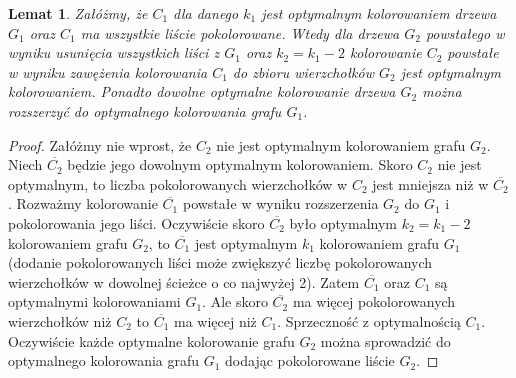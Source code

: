 \documentclass{article}
\newtheorem{lemat}{Lemat}
\begin{document}
\begin{lemat}
Załóżmy, że $C_1$ dla danego $k_1$ jest optymalnym kolorowaniem drzewa $G_1$ oraz $C_1$ ma wszystkie liście pokolorowane. Wtedy dla drzewa $G_2$ powstałego w wyniku usunięcia wszystkich liści z $G_1$ oraz $k_2 = k_1 - 2$ kolorowanie $C_2$ powstałe w wyniku zawężenia kolorowania $C_1$ do zbioru wierzchołków $G_2$ jest optymalnym kolorowaniem. Ponadto dowolne optymalne kolorowanie drzewa $G_2$ można rozszerzyć do optymalnego kolorowania grafu $G_1$.
\end{lemat}
\begin{proof}
Załóżmy nie wprost, że $C_2$ nie jest optymalnym kolorowaniem grafu $G_2$. Niech $\overline{C_2}$ będzie jego dowolnym optymalnym kolorowaniem. Skoro $C_2$ nie jest optymalnym, to liczba pokolorowanych wierzchołków w $C_2$ jest mniejsza niż w $\overline{C_2}$. Rozważmy kolorowanie $\overline{C_1}$ powstałe w wyniku rozszerzenia $G_2$ do $G_1$ i pokolorowania jego liści. Oczywiście skoro $\overline{C_2}$ było optymalnym $k_2 = k_1 - 2$ kolorowaniem grafu $G_2$, to $\overline{C_1}$ jest optymalnym $k_1$ kolorowaniem grafu $G_1$ (dodanie pokolorowanych liści może zwiększyć liczbę pokolorowanych wierzchołków w dowolnej ścieżce o co najwyżej 2). Zatem $\overline{C_1}$ oraz $C_1$ są optymalnymi kolorowaniami $G_1$. Ale skoro $\overline{C_2}$ ma więcej pokolorowanych wierzchołków niż $C_2$ to $\overline{C_1}$ ma więcej niż $C_1$. Sprzeczność z optymalnością $C_1$.\\
Oczywiście każde optymalne kolorowanie grafu $G_2$ można sprowadzić do optymalnego kolorowania grafu $G_1$ dodając pokolorowane liście $G_2$.
\end{proof}
\end{document}
